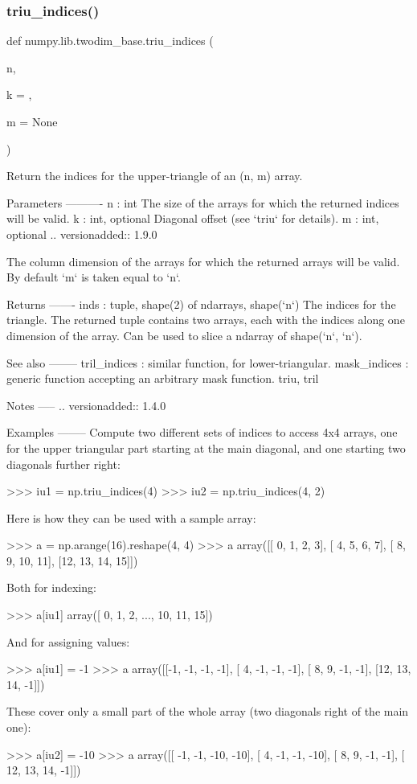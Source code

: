 \subsubsection{\texorpdfstring{triu\+\_\+indices()}{triu\_indices()}}
{\footnotesize\ttfamily def numpy.\+lib.\+twodim\+\_\+base.\+triu\+\_\+indices (\begin{DoxyParamCaption}\item[{}]{n,  }\item[{}]{k = {},  }\item[{}]{m = {\ttfamily None} }\end{DoxyParamCaption})}

\begin{DoxyVerb}Return the indices for the upper-triangle of an (n, m) array.

Parameters
----------
n : int
    The size of the arrays for which the returned indices will
    be valid.
k : int, optional
    Diagonal offset (see `triu` for details).
m : int, optional
    .. versionadded:: 1.9.0

    The column dimension of the arrays for which the returned
    arrays will be valid.
    By default `m` is taken equal to `n`.


Returns
-------
inds : tuple, shape(2) of ndarrays, shape(`n`)
    The indices for the triangle. The returned tuple contains two arrays,
    each with the indices along one dimension of the array.  Can be used
    to slice a ndarray of shape(`n`, `n`).

See also
--------
tril_indices : similar function, for lower-triangular.
mask_indices : generic function accepting an arbitrary mask function.
triu, tril

Notes
-----
.. versionadded:: 1.4.0

Examples
--------
Compute two different sets of indices to access 4x4 arrays, one for the
upper triangular part starting at the main diagonal, and one starting two
diagonals further right:

>>> iu1 = np.triu_indices(4)
>>> iu2 = np.triu_indices(4, 2)

Here is how they can be used with a sample array:

>>> a = np.arange(16).reshape(4, 4)
>>> a
array([[ 0,  1,  2,  3],
       [ 4,  5,  6,  7],
       [ 8,  9, 10, 11],
       [12, 13, 14, 15]])

Both for indexing:

>>> a[iu1]
array([ 0,  1,  2, ..., 10, 11, 15])

And for assigning values:

>>> a[iu1] = -1
>>> a
array([[-1, -1, -1, -1],
       [ 4, -1, -1, -1],
       [ 8,  9, -1, -1],
       [12, 13, 14, -1]])

These cover only a small part of the whole array (two diagonals right
of the main one):

>>> a[iu2] = -10
>>> a
array([[ -1,  -1, -10, -10],
       [  4,  -1,  -1, -10],
       [  8,   9,  -1,  -1],
       [ 12,  13,  14,  -1]])\end{DoxyVerb}
